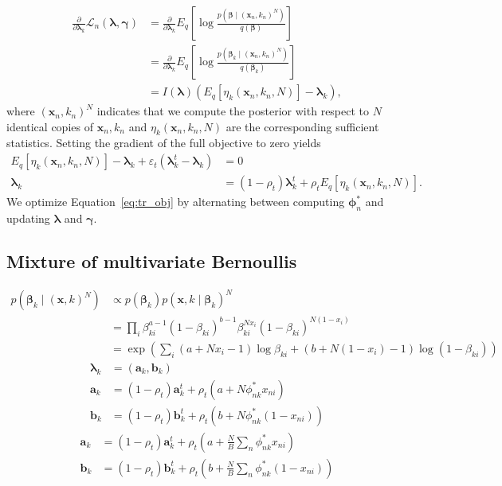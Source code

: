 \documentclass[a4paper]{article}
\begin{document}
		\begin{align}
			\frac{\partial}{\partial \bm{\lambda}_k} \mathcal{L}_n(\bm{\lambda}, \bm{\gamma})
			&= \frac{\partial}{\partial \bm{\lambda}_k} E_q\left[ \log \frac{p(\bm{\beta} \mid (\mathbf{x}_n, k_n)^N)}{q(\bm{\beta})} \right] \\
			&= \frac{\partial}{\partial \bm{\lambda}_k} E_q\left[ \log \frac{p(\bm{\beta}_k \mid (\mathbf{x}_n, k_n)^N)}{q(\bm{\beta}_k)} \right] \\
			&= I(\bm{\lambda}) (E_q\left[ \eta_k(\mathbf{x}_n, k_n, N) \right] - \bm{\lambda}_k),
		\end{align}
		where $(\mathbf{x}_n, k_n)^N$ indicates that we compute the posterior with respect to $N$ identical copies of $\mathbf{x}_n, k_n$
		and $\eta_k(\mathbf{x}_n, k_n, N)$ are the corresponding sufficient statistics. Setting the gradient of the full objective to zero yields
		\begin{align}
			E_q\left[ \eta_k(\mathbf{x}_n, k_n, N) \right] - \bm{\lambda}_k + \varepsilon_t (\bm{\lambda}_k^t - \bm{\lambda}_k) &= 0 \\
			\bm{\lambda}_k &= (1 - \rho_t) \bm{\lambda}_k^t + \rho_t E_q\left[ \eta_k(\mathbf{x}_n, k_n, N) \right].
		\end{align}
		We optimize Equation~\ref{eq:tr_obj} by alternating between computing $\bm{\phi}_n^*$ and updating $\bm{\lambda}$ and $\bm{\gamma}$.

		\subsection*{Mixture of multivariate Bernoullis}
			\begin{align}
				p(\bm{\beta}_k \mid (\mathbf{x}, k)^N )
				&\propto p(\bm{\beta}_k) p(\mathbf{x}, k \mid \bm{\beta}_k)^N \\
				&= \prod_i \beta_{ki}^{a - 1}(1 - \beta_{ki})^{b - 1} \beta_{ki}^{Nx_i} (1 - \beta_{ki})^{N(1 - x_i)} \\
				&= \exp\left( \sum_i (a + N x_i - 1) \log \beta_{ki} + (b + N(1 - x_i) - 1) \log(1 - \beta_{ki}) \right)
			\end{align}
			\begin{align}
				\bm{\lambda}_k &= (\mathbf{a}_k, \mathbf{b}_k) \\
				\mathbf{a}_k &= (1 - \rho_t) \mathbf{a}_k^t + \rho_t (a + N \phi_{nk}^* x_{ni}) \\
				\mathbf{b}_k &= (1 - \rho_t) \mathbf{b}_k^t + \rho_t (b + N \phi_{nk}^* (1 - x_{ni}))
			\end{align}
			\begin{align}
				\mathbf{a}_k &= (1 - \rho_t) \mathbf{a}_k^t + \rho_t \left(a + \frac{N}{B} \sum_n \phi_{nk}^* x_{ni}\right) \\
				\mathbf{b}_k &= (1 - \rho_t) \mathbf{b}_k^t + \rho_t \left(b + \frac{N}{B} \sum_n \phi_{nk}^* (1 - x_{ni})\right)
			\end{align}
\end{document}
